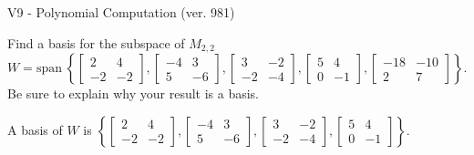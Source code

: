 \begin{exercise}
  \begin{exerciseTitle}V9 - Polynomial Computation (ver. 981)\end{exerciseTitle}
  \begin{exerciseStatement}
    Find a basis for the subspace of \(M_{2,2}\) 
\[W=\mathrm{span}\ \left\{\left[\begin{array}{cc}
2 & 4 \\
-2 & -2
\end{array}\right] , \left[\begin{array}{cc}
-4 & 3 \\
5 & -6
\end{array}\right] , \left[\begin{array}{cc}
3 & -2 \\
-2 & -4
\end{array}\right] , \left[\begin{array}{cc}
5 & 4 \\
0 & -1
\end{array}\right] , \left[\begin{array}{cc}
-18 & -10 \\
2 & 7
\end{array}\right]\right\}.\]
 Be sure to explain why your result is a basis.


  \end{exerciseStatement}
  \begin{exerciseAnswer}
   A basis of \(W\) is  \(\left\{\left[\begin{array}{cc}
2 & 4 \\
-2 & -2
\end{array}\right] , \left[\begin{array}{cc}
-4 & 3 \\
5 & -6
\end{array}\right] , \left[\begin{array}{cc}
3 & -2 \\
-2 & -4
\end{array}\right] , \left[\begin{array}{cc}
5 & 4 \\
0 & -1
\end{array}\right]\right\}\).
  


  \end{exerciseAnswer}
\end{exercise}